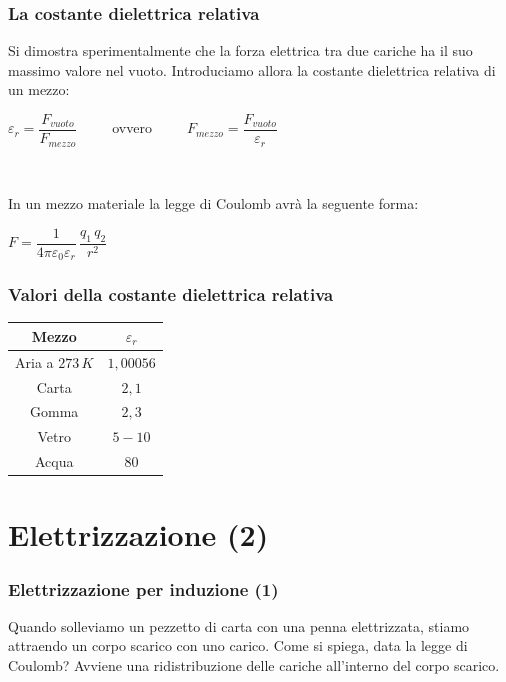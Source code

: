 \documentclass[]{beamer}
\theoremstyle{plain}
\begin{document}
\begin{frame}
\frametitle{La costante dielettrica relativa}
Si dimostra sperimentalmente che la forza elettrica tra due cariche ha il suo massimo valore nel vuoto.{\pause} Introduciamo allora la \alert{costante dielettrica relativa} di un mezzo:
\begin{center}
$ \varepsilon_r = \dfrac{F_{vuoto}}{F_{mezzo}} $~~~~~ovvero~~~~~$ F_{mezzo} = \dfrac{F_{vuoto}}{\varepsilon_r} $
\end{center}\pause

~

In un mezzo materiale la legge di Coulomb avrà la seguente forma:
\begin{center}
\colorbox{blue!30}{$ F = \dfrac{1}{4 \pi \varepsilon_0 \varepsilon_r} \,  \dfrac{q_1 \, q_2}{r^2} $}
\end{center}
\end{frame}





\begin{frame}
\frametitle{Valori della costante dielettrica relativa}
\centering
  \begin{tabular}{c|c}
    \textbf{Mezzo} & \textbf{$ \varepsilon_r $} \\\hline\rule{0pt}{3ex}
    Aria a $ 273 \, K $ & $ 1,00056 $ \\\rule{0pt}{3ex}
    Carta & $ 2,1 $ \\\rule{0pt}{3ex}
    Gomma & $ 2,3 $ \\\rule{0pt}{3ex}
    Vetro & $ 5-10 $ \\\rule{0pt}{3ex}
    Acqua & $ 80 $ \\
  \end{tabular}
\end{frame}






\section{Elettrizzazione (2)}


\begin{frame}
\frametitle{Elettrizzazione per induzione (1)}
Quando solleviamo un pezzetto di carta con una penna elettrizzata, stiamo attraendo un corpo scarico con uno carico. Come si spiega, data la legge di Coulomb?\pause
{}
Avviene una \alert{ridistribuzione delle cariche} all'interno del corpo scarico.

\end{frame}
\end{document}
